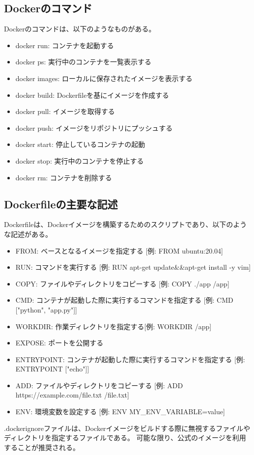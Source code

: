 \documentclass{ltjsarticle}
\begin{document}
\subsection{Dockerのコマンド}
Dockerのコマンドは、以下のようなものがある。
\begin{itemize}
  \item docker run: コンテナを起動する
  \item docker ps: 実行中のコンテナを一覧表示する
  \item docker images: ローカルに保存されたイメージを表示する
  \item docker build: Dockerfileを基にイメージを作成する
  \item docker pull: イメージを取得する
  \item docker push: イメージをリポジトリにプッシュする
  \item docker start: 停止しているコンテナの起動
  \item docker stop: 実行中のコンテナを停止する
  \item docker rm: コンテナを削除する
\end{itemize}

\subsection{Dockerfileの主要な記述}
Dockerfileは、Dockerイメージを構築するためのスクリプトであり、以下のような記述がある。
\begin{itemize}
  \item FROM: ベースとなるイメージを指定する [例: FROM ubuntu:20.04]
  \item RUN: コマンドを実行する [例: RUN apt-get update\&\&apt-get install -y vim]
  \item COPY: ファイルやディレクトリをコピーする [例: COPY ./app /app]
  \item CMD: コンテナが起動した際に実行するコマンドを指定する [例: CMD ["python", "app.py"]]
  \item WORKDIR: 作業ディレクトリを指定する[例: WORKDIR /app]
  \item EXPOSE: ポートを公開する
  \item ENTRYPOINT: コンテナが起動した際に実行するコマンドを指定する [例: ENTRYPOINT ["echo"]]
  \item ADD: ファイルやディレクトリをコピーする [例: ADD https://example.com/file.txt /file.txt]
  \item ENV: 環境変数を設定する [例: ENV MY\_ENV\_VARIABLE=value]
\end{itemize}
.dockerignoreファイルは、Dockerイメージをビルドする際に無視するファイルやディレクトリを指定するファイルである。
可能な限り、公式のイメージを利用することが推奨される。
\end{document}
